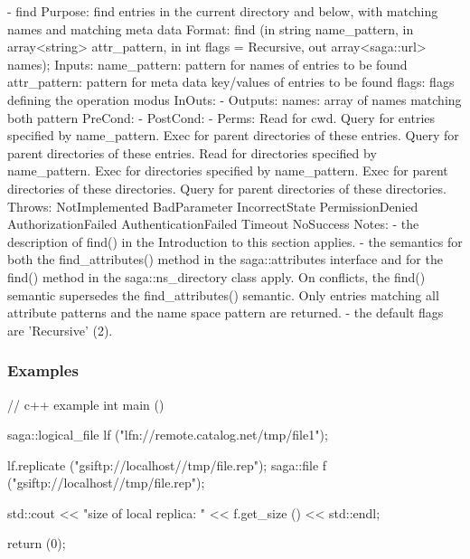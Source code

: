 \begin{myspec}
 
    - find
      Purpose:  find entries in the current directory and below, 
                with matching names and matching meta data
      Format:   find             (in  string           name_pattern,
                                  in  array<string>    attr_pattern,
                                  in  int              flags = Recursive,
                                  out array<saga::url> names);
      Inputs:   name_pattern:     pattern for names of
                                  entries to be found
                attr_pattern:     pattern for meta data
                                  key/values of entries to be 
                                  found
                flags:            flags defining the operation
                                  modus
      InOuts:   -
      Outputs:  names:            array of names matching both
                                  pattern
      PreCond:  -
      PostCond: -
      Perms:    Read  for cwd.
                Query for entries specified by name_pattern.
                Exec  for parent directories of these entries.
                Query for parent directories of these entries.
                Read  for directories specified by name_pattern.
                Exec  for directories specified by name_pattern.
                Exec  for parent directories of these directories.
                Query for parent directories of these directories.
      Throws:   NotImplemented
                BadParameter
                IncorrectState
                PermissionDenied
                AuthorizationFailed
                AuthenticationFailed
                Timeout
                NoSuccess
      Notes:    - the description of find() in the Introduction
                  to this section applies.
                - the semantics for both the find_attributes()
                  method in the saga::attributes interface and 
                  for the find() method in the 
                  saga::ns_directory class apply.  On 
                  conflicts, the find() semantic supersedes 
                  the find_attributes() semantic.  Only entries
                  matching all attribute patterns and the name 
                  space pattern are returned.
                - the default flags are 'Recursive' (2).
 \end{myspec}
 
 
 \subsubsection{Examples}
 
 \begin{mycode}
  // c++ example
  int main ()
  {
    saga::logical_file lf ("lfn://remote.catalog.net/tmp/file1");
 
    lf.replicate ("gsiftp://localhost//tmp/file.rep");
    saga::file f ("gsiftp://localhost//tmp/file.rep");
 
    std::cout << "size of local replica: "
              << f.get_size ()
              << std::endl;
 
    return (0);
  }
 \end{mycode}
 
 
